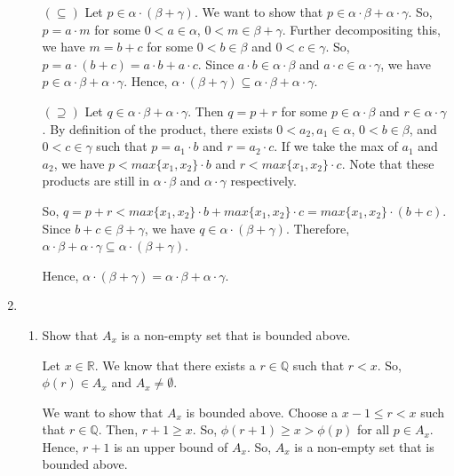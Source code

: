 \documentclass[12pt]{article}
\begin{document}
\begin{enumerate}[start=1,label={\bfseries Problem \arabic*:},leftmargin=1in]
\begin{itemize}
        $(\subseteq)$ Let $p \in \alpha \cdot (\beta + \gamma)$. We want to show that $p \in \alpha \cdot \beta + \alpha \cdot \gamma$.
        So, $p = a \cdot m$ for some $0 < a \in \alpha$, $0 < m \in \beta + \gamma$. Further decompositing this, we have $m = b + c$ for some $0 < b \in \beta$ and $0 < c \in \gamma$. 
        So, $p = a \cdot (b + c) = a \cdot b + a \cdot c$. Since $a \cdot b \in \alpha \cdot \beta$ and $a \cdot c \in \alpha \cdot \gamma$, we have $p \in \alpha \cdot \beta + \alpha \cdot \gamma$. 
        Hence, $\alpha \cdot (\beta + \gamma) \subseteq \alpha \cdot \beta + \alpha \cdot \gamma$.

        $(\supseteq)$ Let $q \in \alpha \cdot \beta + \alpha \cdot \gamma$. Then $q = p + r$ for some $p \in \alpha \cdot \beta$ and $r \in \alpha \cdot \gamma$. By definition of the product, there exists $0 < a_{2}, a_{1} \in \alpha$, $0 < b \in \beta$, and $0 < c \in \gamma$ such that $p = a_{1} \cdot b$ and $r = a_{2} \cdot c$. 
        If we take the max of $a_{1}$ and $a_{2}$, we have $p < max\{x_{1}, x_{2}\} \cdot b$ and $r < max\{x_{1}, x_{2}\} \cdot c$. Note that these products are still in $\alpha \cdot \beta$ and $\alpha \cdot \gamma$ respectively.

        So, $q = p + r < max\{x_{1}, x_{2}\} \cdot b + max\{x_{1}, x_{2}\} \cdot c = max\{x_{1}, x_{2}\} \cdot (b + c)$. Since $b + c \in \beta + \gamma$, we have $q \in \alpha \cdot (\beta + \gamma)$. Therefore, $\alpha \cdot \beta + \alpha \cdot \gamma \subseteq \alpha \cdot (\beta + \gamma)$.

        Hence, $\alpha \cdot (\beta + \gamma) = \alpha \cdot \beta + \alpha \cdot \gamma$.
    \end{itemize}

    \item \begin{enumerate}
        \item Show that $A_{x}$ is a non-empty set that is bounded above. 
        
        Let $x \in \mathbb{R}$. 
        We know that there exists a $r \in \mathbb{Q}$ such that $r < x$. So, $\phi(r) \in A_{x}$ and $A_{x} \neq \emptyset$.
        
        We want to show that $A_{x}$ is bounded above. Choose a $x - 1 \leq r < x$ such that $r \in \mathbb{Q}$. Then, $r + 1 \geq x$. 
        So, $\phi(r + 1) \geq x > \phi(p)$ for all $p \in A_{x}$. Hence, $r + 1$ is an upper bound of $A_{x}$.
        So, $A_{x}$ is a non-empty set that is bounded above.


\end{enumerate}
\end{enumerate}
\end{document}
